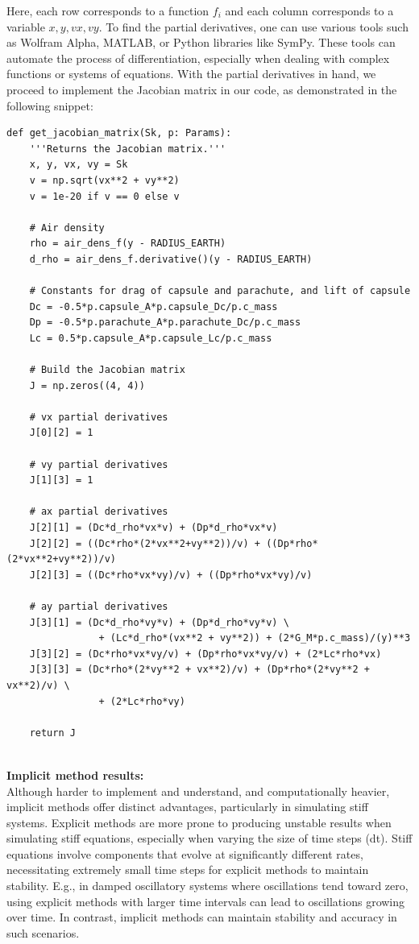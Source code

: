\documentclass[runningheads]{llncs}
\begin{document}
Here, each row corresponds to a function \( f_i \) and each column corresponds to a variable \( x, y, vx, vy \). To find the partial derivatives, one can use various tools such as Wolfram Alpha, MATLAB, or Python libraries like SymPy. These tools can automate the process of differentiation, especially when dealing with complex functions or systems of equations. With the partial derivatives in hand, we proceed to implement the Jacobian matrix in our code, as demonstrated in the following snippet:

\begin{verbatim}
def get_jacobian_matrix(Sk, p: Params):
    '''Returns the Jacobian matrix.'''
    x, y, vx, vy = Sk
    v = np.sqrt(vx**2 + vy**2)
    v = 1e-20 if v == 0 else v

    # Air density
    rho = air_dens_f(y - RADIUS_EARTH)
    d_rho = air_dens_f.derivative()(y - RADIUS_EARTH)

    # Constants for drag of capsule and parachute, and lift of capsule 
    Dc = -0.5*p.capsule_A*p.capsule_Dc/p.c_mass
    Dp = -0.5*p.parachute_A*p.parachute_Dc/p.c_mass
    Lc = 0.5*p.capsule_A*p.capsule_Lc/p.c_mass
    
    # Build the Jacobian matrix
    J = np.zeros((4, 4))

    # vx partial derivatives 
    J[0][2] = 1
    
    # vy partial derivatives
    J[1][3] = 1

    # ax partial derivatives
    J[2][1] = (Dc*d_rho*vx*v) + (Dp*d_rho*vx*v)
    J[2][2] = ((Dc*rho*(2*vx**2+vy**2))/v) + ((Dp*rho*(2*vx**2+vy**2))/v)
    J[2][3] = ((Dc*rho*vx*vy)/v) + ((Dp*rho*vx*vy)/v)

    # ay partial derivatives
    J[3][1] = (Dc*d_rho*vy*v) + (Dp*d_rho*vy*v) \
                + (Lc*d_rho*(vx**2 + vy**2)) + (2*G_M*p.c_mass)/(y)**3
    J[3][2] = (Dc*rho*vx*vy/v) + (Dp*rho*vx*vy/v) + (2*Lc*rho*vx)
    J[3][3] = (Dc*rho*(2*vy**2 + vx**2)/v) + (Dp*rho*(2*vy**2 + vx**2)/v) \
                + (2*Lc*rho*vy)

    return J
\end{verbatim}


\textbf{\\Implicit method results:\\}
Although harder to implement and understand, and computationally heavier, implicit methods offer distinct advantages, particularly in simulating stiff systems. Explicit methods are more prone to producing unstable results when simulating stiff equations, especially when varying the size of time steps (dt). Stiff equations involve components that evolve at significantly different rates, necessitating extremely small time steps for explicit methods to maintain stability. E.g., in damped oscillatory systems where oscillations tend toward zero, using explicit methods with larger time intervals can lead to oscillations growing over time. In contrast, implicit methods can maintain stability and accuracy in such scenarios.
\end{document}
